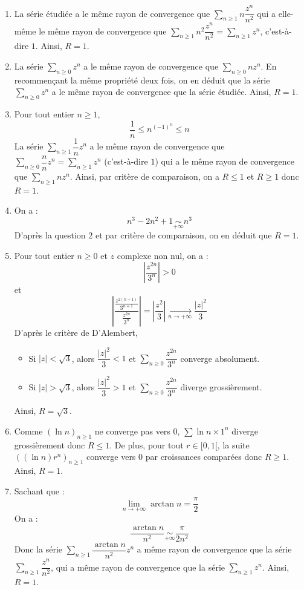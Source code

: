 \documentclass[a4paper,twoside,french,11pt]{VcCours}
\newcommand{\Sum}[2]{\sum_{#1}^{#2}}
\begin{document}
\begin{enumerate}
\item La série étudiée a le même rayon de convergence que $\Sum{n \geq 1}{} n \dfrac{z^n}{n^2}$ qui a elle-même le même rayon de convergence que $\Sum{n \geq 1}{} n^2 \dfrac{z^n}{n^2} = \Sum{n \geq 1}{} z^n$, c'est-à-dire $1$. Ainsi, $R=1$.
\item La série $\Sum{n \geq 0}{} z^n$ a le même rayon de convergence que $\Sum{n \geq 0}{} n z^n$. En recommençant la même propriété deux fois, on en déduit que la série $\Sum{n \geq 0}{} z^n$ a le même rayon de convergence que la série étudiée. Ainsi, $R=1$.
\item Pour tout entier $n \geq 1$,
$$ \dfrac{1}{n} \leq n^{(-1)^n} \leq n$$
La série $\Sum{n \geq 1}{} \dfrac{1}{n} z^n$ a le même rayon de convergence que $\Sum{n \geq 0}{} \dfrac{n}{n} z^n = \Sum{n \geq 1}{}  z^n$ (c'est-à-dire $1$) qui a le même rayon de convergence que $\Sum{n \geq 1}{} n z^n$. Ainsi, par critère de comparaison, on a $R \leq 1$ et $R \geq 1$ donc $R=1$.
\item On a :
$$ n^3-2n^2+1 \underset{+ \infty}{\sim} n^3$$
D'après la question $2$ et par critère de comparaison, on en déduit que $R=1$.
\item Pour tout entier $n \geq 0$ et $z$ complexe non nul, on a :
$$ \left\vert \frac{z^{2n}}{3^n} \right\vert >0$$
et 
$$ \left\vert\dfrac{\frac{z^{2(n+1)}}{3^{n+1}}}{\frac{z^{2n}}{3^n}}\right\vert=\left\vert\dfrac{z^2}{3}\right\vert\underset{n\to +\infty}{\longrightarrow}\dfrac{\vert z\vert^2}{3}$$
D'après le critère de D'Alembert,
\begin{itemize}
\item Si $\vert z\vert<\sqrt{3}$, alors $\dfrac{\vert z\vert^2}{3}<1$ et $\Sum{n \geq 0}{}\dfrac{z^{2n}}{3^n}$ converge absolument. 
\item Si $\vert z\vert>\sqrt{3}$, alors $\dfrac{\vert z\vert^2}{3}>1$ et $\Sum{n \geq 0}{} \dfrac{z^{2n}}{3^n}$ diverge grossièrement. 
\end{itemize}
Ainsi, $R=\sqrt{3}$.
\item Comme $(\ln n)_{n\geq 1}$ ne converge pas vers $0$, $\sum \ln n \times 1^n$ diverge grossièrement donc $R\leq 1$. De plus, pour tout $r \in [0,1[$, la suite $((\ln n)r^n)_{n\geq 1}$ converge vers $0$ par croissances comparées donc $R\geq 1$. Ainsi, $R=1$.
\item Sachant que :
$$\lim_{n\to +\infty}\arctan n=\dfrac{\pi}{2}$$
On a :
\[
\dfrac{\arctan n}{n^2} \underset{ +\infty}{\sim}\dfrac{\pi}{2n^2}
\]
Donc la série $\Sum{n \geq 1}{} \dfrac{\arctan n}{n^2}z^n$ a même rayon de convergence que la série $\Sum{n \geq 1}{}  \dfrac{z^n}{n^2}$, qui a même rayon de convergence que la série $\Sum{n \geq 1}{}  z^n$. Ainsi, $R=1$.

\end{enumerate}
\end{document}

